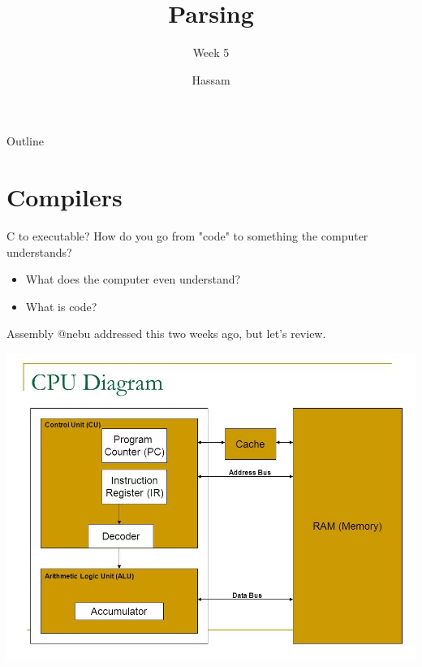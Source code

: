 \documentclass[aspectratio=169]{beamer}
\title{Parsing}
\subtitle{Week 5}
\author{Hassam}
\date{}
\begin{document}

\begin{frame}
\titlepage
\end{frame}

\begin{frame}{Outline}
  \tableofcontents
\end{frame}


\section{Compilers}
\frame{\sectionpage}

\begin{frame}{C to executable?}
    How do you go from "code" to something the computer understands? \pause 
    \begin{itemize}
        \item What does the computer even understand? \pause 
        \item What is code? 
    \end{itemize}
\end{frame}

\begin{frame}{Assembly}
    @nebu addressed this two weeks ago, but let's review.
\end{frame}

\begin{frame}{}
    \begin{center}
        \includegraphics[width=\textwidth]{cpu.png}
    \end{center}
\end{frame}
\end{document}
